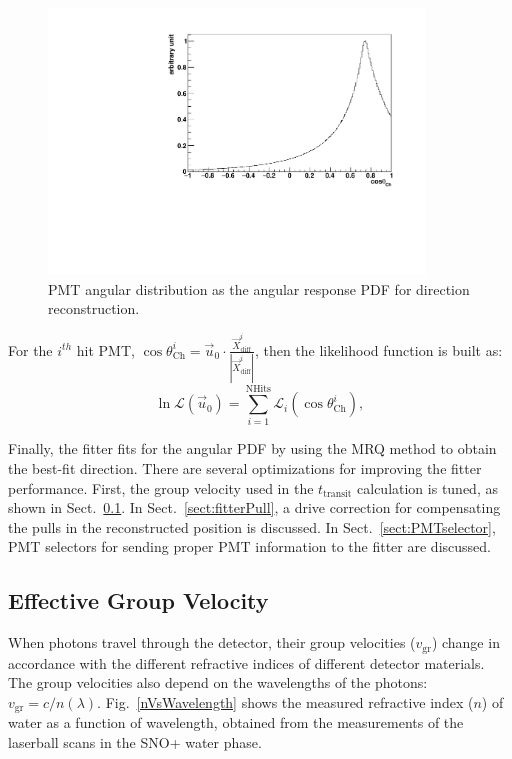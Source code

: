 \begin{figure}[!htb]
	\centering
	\includegraphics[width=10cm]{MPW_angularPDF.pdf}
	\caption{PMT angular distribution as the angular response PDF for direction reconstruction.}
	\label{fig:MPW_angularPDF}
\end{figure}

For the $i^{th}$ hit PMT, $\cos\theta^i_{\mathrm{Ch}}=\vec{u}_0\cdot\frac{\vec{X}^i_{{\mathrm{diff}}}}{|\vec{X}^i_{{\mathrm{diff}}}|}$, then the likelihood function is built as:
\begin{equation}
\ln \mathcal{L}(\vec{u}_0)=\sum_{i=1}^{{\mathrm{NHits}}}\mathcal{L}_i(\cos\theta_{\mathrm{Ch}}^i),
\end{equation}

Finally, the fitter fits for the angular PDF by using the MRQ method to obtain the best-fit direction. There are several optimizations for improving the fitter performance. First, the group velocity used in the $t_{\mathrm{transit}}$ calculation is tuned, as shown in Sect.~\ref{sect:tuneGroupVelocity}. In Sect.~\ref{sect:fitterPull}, a drive correction for compensating the pulls in the reconstructed position is discussed. In Sect.~\ref{sect:PMTselector}, PMT selectors for sending proper PMT information to the fitter are discussed. 

\subsection{Effective Group Velocity}\label{sect:tuneGroupVelocity}

When photons travel through the detector, their group velocities ($v_\mathrm{gr}$) change in accordance with the different refractive indices of different detector materials. The group velocities also depend on the wavelengths of the photons: $v_\mathrm{gr}=c/n(\lambda)$. Fig.~\ref{nVsWavelength} shows the measured refractive index ($n$) of water as a function of wavelength, obtained from the measurements of the laserball scans in the SNO+ water phase\cite{laserball_groupVelocity}. %

